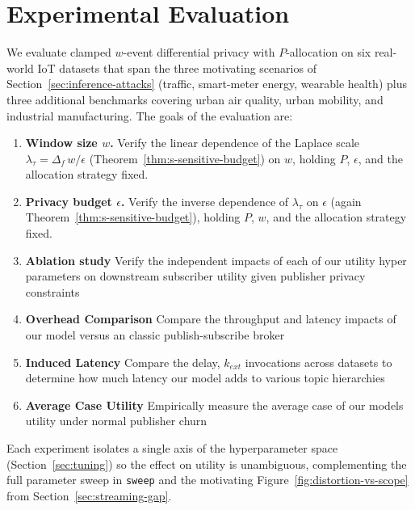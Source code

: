 \section{Experimental Evaluation}
\label{sec:experiment}


We evaluate clamped $w$-event differential privacy with $P$-allocation on six real-world IoT datasets that span the three motivating scenarios of Section~\ref{sec:inference-attacks} (traffic, smart-meter energy, wearable health) plus three additional benchmarks covering urban air quality, urban mobility, and industrial manufacturing. The goals of the evaluation are:
\begin{enumerate}
\item \textbf{Window size $w$.} Verify the linear dependence of the Laplace scale $\lambda_\tau = \Delta_f\,w/\epsilon$ (Theorem~\ref{thm:s-sensitive-budget}) on $w$, holding $P$, $\epsilon$, and the allocation strategy fixed.
\item \textbf{Privacy budget $\epsilon$.} Verify the inverse dependence of $\lambda_\tau$ on $\epsilon$ (again Theorem~\ref{thm:s-sensitive-budget}), holding $P$, $w$, and the allocation strategy fixed.
\item \textbf{Ablation study} Verify the independent impacts of each of our utility hyper parameters on downstream subscriber utility given publisher privacy constraints
\item \textbf{Overhead Comparison} Compare the throughput and latency impacts of our model versus an classic publish-subscribe broker
\item \textbf{Induced Latency} Compare the delay, $k_{ext}$ invocations across datasets to determine how much latency our model adds to various topic hierarchies
\item \textbf{Average Case Utility} Empirically measure the average case of our models utility under normal publisher churn
\end{enumerate}
Each experiment isolates a single axis of the hyperparameter space (Section~\ref{sec:tuning}) so the effect on utility is unambiguous, complementing the full parameter sweep in \texttt{sweep} and the motivating Figure~\ref{fig:distortion-vs-scope} from Section~\ref{sec:streaming-gap}.

